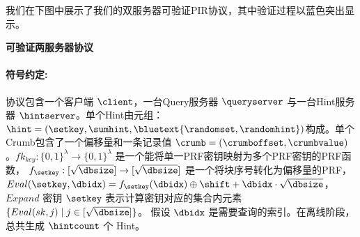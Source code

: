 我们在下图中展示了我们的双服务器可验证PIR协议，其中验证过程以蓝色突出显示。

    \begin{mdframed}
        \centering
        \textbf{可验证两服务器协议}

        \raggedright
        \paragraph{符号约定:} 协议包含一个客户端 $\client$，一台Query服务器 $\queryserver$ 与一台Hint服务器 $\hintserver$。单个Hint由元组：$\hint=(\setkey,\sumhint,\bluetext{\randomset,\randomhint})$构成。单个Crumb包含了一个偏移量和一条记录值 $\crumb=(\crumboffset,\crumbvalue)$。$fk_{key}:\{0,1\}^\lambda \to \{0,1\}^\lambda$ 是一个能将单一PRF密钥映射为多个PRF密钥的PRF函数， $f_{\setkey}: [\sqrt{\dbsize}]\to [\sqrt{\dbsize}]$ 是一个将块序号转化为偏移量的PRF，  $Eval(\setkey,\dbidx) = f_{\setkey}(\dbidx)\oplus \shift + \dbidx\cdot\sqrt{\dbsize}$，$Expand$ 密钥 $\setkey$ 表示计算密钥对应的集合内元素 $\{Eval(sk,j) \mid j\in[\sqrt{\dbsize}]\}$。  假设 $\dbidx$ 是需要查询的索引。在离线阶段，总共生成 $\hintcount$ 个 Hint。


\end{mdframed}
